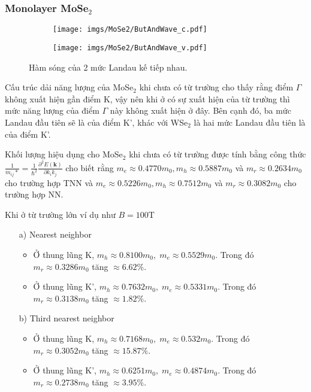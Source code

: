 \documentclass{article}
\begin{document}
\newpage
\subsubsection*{Monolayer MoSe$_{2}$}
\begin{figure}[htb]
	\begin{subfigure}{0.495\textwidth}
		\centering
		\texttt{[image: imgs/MoSe2/ButAndWave\_c.pdf]}
	\end{subfigure}
	\begin{subfigure}{0.495\textwidth}
		\centering
		\texttt{[image: imgs/MoSe2/ButAndWave\_v.pdf]}
	\end{subfigure}
	\caption{Hàm sóng của 2 mức Landau kế tiếp nhau.}
\end{figure}
Cấu trúc dải năng lượng của MoSe$_{2}$ khi chưa có từ trường cho thấy rằng điểm $\Gamma$ không xuất hiện gần điểm K, vậy nên khi ở có sự xuất hiện của từ trường thì mức năng lượng của điểm $\Gamma$ này không xuất hiện ở đây. Bên cạnh đó, ba mức Landau đầu tiên sẽ là của điểm K', khác với WSe$_{2}$ là hai mức Landau đầu tiên là của điểm K'.

Khối lượng hiệu dụng cho MoSe$_{2}$ khi chưa có từ trường được tính bằng công thức $\frac{1}{m_{ij}*} =\frac{1}{\hbar^{2}} \frac{\partial^{2} E(\mathbf{k})}{\partial k_{i} k_{j}}$ cho biết rằng $m_{e} \approx 0.4770 m_{0}, m_{h} \approx 0.5887 m_{0}$ và $m_{r} \approx 0.2634 m_{0}$ cho trường hợp TNN và $m_{e} \approx 0.5226 m_{0}, m_{h} \approx 0.7512 m_{0}$ và $m_{r} \approx 0.3082m_{0}$ cho trường hợp NN.

Khi ở từ trường lớn ví dụ như $B = 100 $T
\begin{itemize}
	\item[a)] Nearest neighbor
	\begin{itemize}
		\item Ở thung lũng K, $m_{h} \approx 0.8100 m_{0},\; m_{e} \approx 0.5529 m_{0}$. Trong đó $m_{r} \approx 0.3286 m_{0}$ tăng $\approx 6.62\%$.
		
		\item Ở thung lũng K', $m_{h} \approx 0.7632 m_{0},\; m_{e} \approx 0.5331 m_{0}$. Trong đó $m_{r} \approx 0.3138 m_{0}$ tăng $\approx 1.82\%$.
	\end{itemize}
	\item[b)] Third nearest neighbor
	\begin{itemize}
		\item Ở thung lũng K, $m_{h} \approx 0.7168 m_{0},\; m_{e} \approx 0.532 m_{0}$. 
		Trong đó $m_{r} \approx 0.3052 m_{0}$ tăng $\approx 15.87\%$.
		
		\item Ở thung lũng K', $m_{h} \approx 0.6251 m_{0},\; m_{e} \approx 0.4874 m_{0}$. 
		Trong đó $m_{r} \approx 0.2738 m_{0}$ tăng $\approx 3.95\%$.
	\end{itemize}
\end{itemize}
\end{document}
